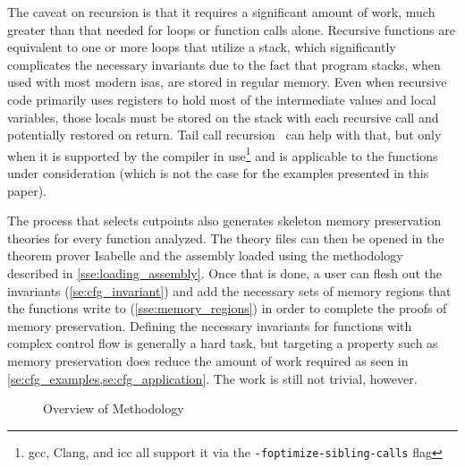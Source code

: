 The caveat on recursion is that it requires a significant amount of work,
much greater than that needed for loops or function calls alone.
Recursive functions are equivalent to one or more loops that utilize a stack,
which significantly complicates the necessary invariants
due to the fact that program stacks, when used with most modern \acp{isa},
are stored in regular memory.
Even when recursive code primarily uses registers
to hold most of the intermediate values and local variables,
those locals must be stored on the stack with each recursive call
and potentially restored on return.
Tail call recursion~\citep{clinger1998tail} can help with that,
but only when it is supported by the compiler in use\footnote{%
  \acs{gcc}, Clang, and \acs{icc} all support it via the \texttt{-foptimize-sibling-calls} flag
} and is applicable to the functions under consideration
(which is not the case for the examples presented in this paper).

The process that selects cutpoints
also generates skeleton memory preservation theories for every function analyzed.
The theory files can then be opened in the theorem prover Isabelle
and the assembly loaded using the methodology described in \cref{sse:loading_assembly}.
Once that is done, a user can flesh out the invariants (\cref{se:cfg_invariant})
and add the necessary sets of memory regions
that the functions write to (\cref{sse:memory_regions})
in order to complete the proofs of memory preservation.
Defining the necessary invariants for functions with complex control flow
is generally a hard task,
but targeting a property such as memory preservation
does reduce the amount of work required
as seen in \cref{se:cfg_examples,se:cfg_application}.
The work is still not trivial, however.

\begin{figure}
  \centering
  \caption{Overview of Methodology}\label{fig:cfg_overview}
\end{figure}

